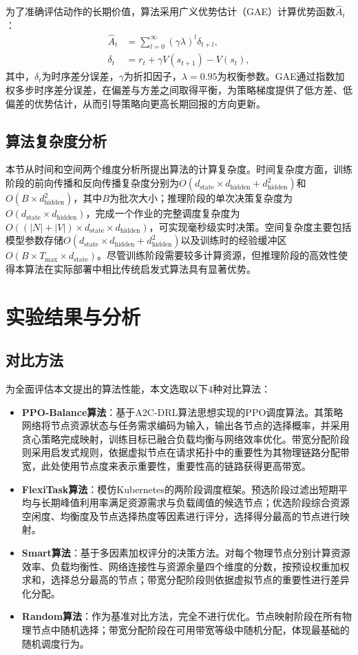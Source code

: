 为了准确评估动作的长期价值，算法采用广义优势估计（GAE）计算优势函数$\hat{A}_t$：
\begin{align}
    \hat{A}_t &= \sum_{l=0}^{\infty} (\gamma\lambda)^l \delta_{t+l}, \\
    \delta_t &= r_t + \gamma V(s_{t+1}) - V(s_t),
\end{align}
其中，$\delta_t$为时序差分误差，$\gamma$为折扣因子，$\lambda=0.95$为权衡参数。GAE通过指数加权多步时序差分误差，在偏差与方差之间取得平衡，为策略梯度提供了低方差、低偏差的优势估计，从而引导策略向更高长期回报的方向更新。

\subsection{算法复杂度分析}
本节从时间和空间两个维度分析所提出算法的计算复杂度。时间复杂度方面，训练阶段的前向传播和反向传播复杂度分别为$O(d_{\text{state}} \times d_{\text{hidden}} + d_{\text{hidden}}^2)$和$O(B \times d_{\text{hidden}}^2)$，其中$B$为批次大小；推理阶段的单次决策复杂度为$O(d_{\text{state}} \times d_{\text{hidden}})$，完成一个作业的完整调度复杂度为$O((|N|+|V|) \times d_{\text{state}} \times d_{\text{hidden}})$，可实现毫秒级实时决策。空间复杂度主要包括模型参数存储$O(d_{\text{state}} \times d_{\text{hidden}} + d_{\text{hidden}}^2)$以及训练时的经验缓冲区$O(B \times T_{\max} \times d_{\text{state}})$。尽管训练阶段需要较多计算资源，但推理阶段的高效性使得本算法在实际部署中相比传统启发式算法具有显著优势。

\section{实验结果与分析}
\subsection{对比方法}
为全面评估本文提出的算法性能，本文选取以下4种对比算法：
\begin{itemize}
    \item \textbf{PPO-Balance算法}：基于A2C-DRL\cite{A2C-DRL}算法思想实现的PPO调度算法。其策略网络将节点资源状态与任务需求编码为输入，输出各节点的选择概率，并采用贪心策略完成映射，训练目标已融合负载均衡与网络效率优化。带宽分配阶段则采用启发式规则，依据虚拟节点在请求拓扑中的重要性为其物理链路分配带宽，此处使用节点度来表示重要性，重要性高的链路获得更高带宽。

    \item \textbf{FlexiTask算法}\cite{FlexiTask}：模仿Kubernetes的两阶段调度框架。预选阶段过滤出短期平均与长期峰值利用率满足资源需求与负载阈值的候选节点；优选阶段综合资源空闲度、均衡度及节点选择热度等因素进行评分，选择得分最高的节点进行映射。

    \item \textbf{Smart算法}：基于多因素加权评分的决策方法。对每个物理节点分别计算资源效率、负载均衡性、网络连接性与资源余量四个维度的分数，按预设权重加权求和，选择总分最高的节点；带宽分配阶段则依据虚拟节点的重要性进行差异化分配。

    \item \textbf{Random算法}：作为基准对比方法，完全不进行优化。节点映射阶段在所有物理节点中随机选择；带宽分配阶段在可用带宽等级中随机分配，体现最基础的随机调度行为。
\end{itemize}


